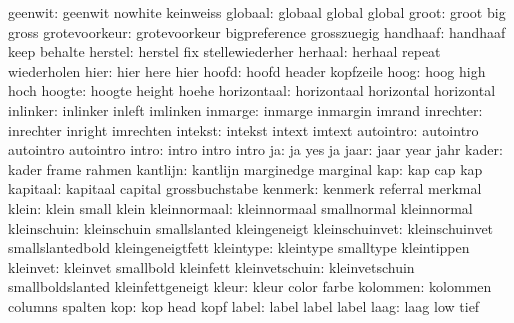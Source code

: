             geenwit:  geenwit              nowhite             keinweiss
            globaal:  globaal              global              global
              groot:  groot                big                 gross
      grotevoorkeur:  grotevoorkeur        bigpreference       grosszuegig
           handhaaf:  handhaaf             keep                behalte
            herstel:  herstel              fix                 stellewiederher
            herhaal:  herhaal              repeat              wiederholen
               hier:  hier                 here                hier
              hoofd:  hoofd                header              kopfzeile
               hoog:  hoog                 high                hoch
             hoogte:  hoogte               height              hoehe
        horizontaal:  horizontaal          horizontal          horizontal
           inlinker:  inlinker             inleft              imlinken
            inmarge:  inmarge              inmargin            imrand
          inrechter:  inrechter            inright             imrechten
            intekst:  intekst              intext              imtext
          autointro:  autointro            autointro           autointro
              intro:  intro                intro               intro
                 ja:  ja                   yes                 ja
               jaar:  jaar                 year                jahr
              kader:  kader                frame               rahmen
           kantlijn:  kantlijn             marginedge          marginal
                kap:  kap                  cap                 kap
           kapitaal:  kapitaal             capital             grossbuchstabe
            kenmerk:  kenmerk              referral            merkmal
              klein:  klein                small               klein
       kleinnormaal:  kleinnormaal         smallnormal         kleinnormal
        kleinschuin:  kleinschuin          smallslanted        kleingeneigt
     kleinschuinvet:  kleinschuinvet       smallslantedbold    kleingeneigtfett
          kleintype:  kleintype            smalltype           kleintippen
           kleinvet:  kleinvet             smallbold           kleinfett
     kleinvetschuin:  kleinvetschuin       smallboldslanted    kleinfettgeneigt
              kleur:  kleur                color               farbe
           kolommen:  kolommen             columns             spalten
                kop:  kop                  head                kopf
              label:  label                label               label
               laag:  laag                 low                 tief

